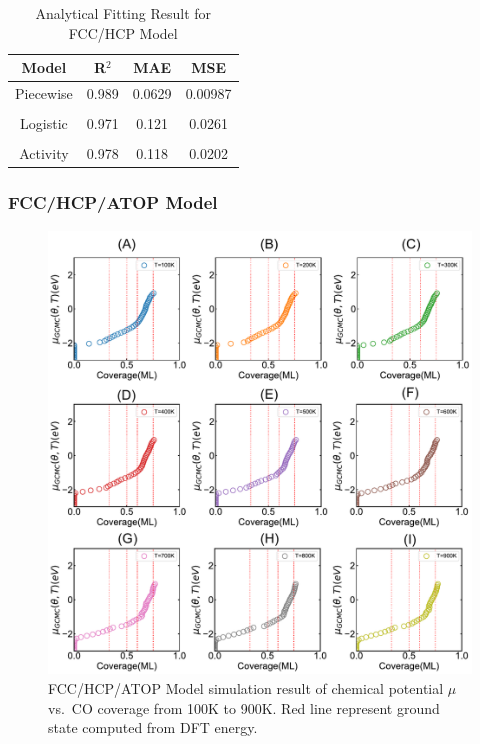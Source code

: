 \documentclass[11pt]{article}
\begin{document}
\begin{table} [h]
\caption{Analytical Fitting Result for FCC/HCP Model }
\centering
\begin{tabular} {c c c c}
\toprule
Model & R$^2$&MAE&MSE\\
\midrule
Piecewise     &0.989 &0.0629&0.00987 \\
\\
Logistic  & 0.971 &0.121&0.0261 \\
\\
Activity  & 0.978 &0.118&0.0202 \\
\bottomrule
\end{tabular}
\label{2sitesimu}
\end{table}

\clearpage

\subsubsection*{FCC/HCP/ATOP Model}
\begin{figure} [ht]
\centering
\includegraphics[width=15cm]{Figure/3Miu-T.pdf}
\caption{FCC/HCP/ATOP Model simulation result of chemical potential $\mu$ vs.\ CO coverage from 100K to 900K. Red line represent ground state computed from DFT energy.}
\label{3miu} 
\end{figure}
\clearpage
\end{document}
